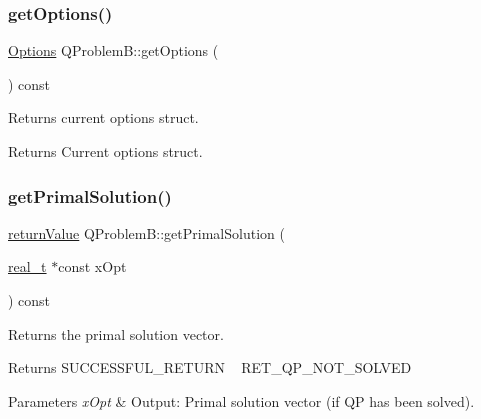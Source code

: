 \subsubsection{\texorpdfstring{get\+Options()}{getOptions()}}
{\footnotesize\ttfamily \hyperlink{class_options}{Options} Q\+Problem\+B\+::get\+Options (\begin{DoxyParamCaption}{ }\end{DoxyParamCaption}) const\hspace{0.3cm}{\ttfamily [inline]}}

Returns current options struct. \begin{DoxyReturn}{Returns}
Current options struct. 
\end{DoxyReturn}
\mbox{\label{class_q_problem_b_a979e1f541b8e894a3dfd9ec37f95458e}} 
\subsubsection{\texorpdfstring{get\+Primal\+Solution()}{getPrimalSolution()}}
{\footnotesize\ttfamily \hyperlink{_message_handling_8hpp_a81d556f613bfbabd0b1f9488c0fa865e}{return\+Value} Q\+Problem\+B\+::get\+Primal\+Solution (\begin{DoxyParamCaption}\item[{\hyperlink{qp_o_a_s_e_s__wrapper_8h_a0d00e2b3dfadee81331bbb39068570c4}{real\+\_\+t} $\ast$const}]{x\+Opt }\end{DoxyParamCaption}) const}

Returns the primal solution vector. \begin{DoxyReturn}{Returns}
S\+U\+C\+C\+E\+S\+S\+F\+U\+L\+\_\+\+R\+E\+T\+U\+RN ~\newline
 R\+E\+T\+\_\+\+Q\+P\+\_\+\+N\+O\+T\+\_\+\+S\+O\+L\+V\+ED 
\end{DoxyReturn}

\begin{DoxyParams}{Parameters}
{\em x\+Opt} & Output\+: Primal solution vector (if QP has been solved). \\
\hline
\end{DoxyParams}
\mbox{\label{class_q_problem_b_abe79cfdbf6cec0560d08bc0eaab05210}} 
